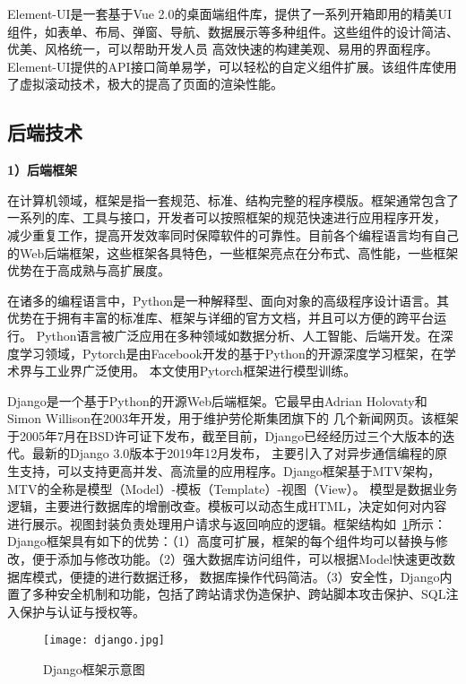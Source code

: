 Element-UI是一套基于Vue 2.0的桌面端组件库，提供了一系列开箱即用的精美UI组件，如表单、布局、弹窗、导航、数据展示等多种组件。这些组件的设计简洁、优美、风格统一，可以帮助开发人员 
高效快速的构建美观、易用的界面程序。Element-UI提供的API接口简单易学，可以轻松的自定义组件扩展。该组件库使用了虚拟滚动技术，极大的提高了页面的渲染性能。

\subsection{后端技术}

\textbf{1）后端框架}

在计算机领域，框架是指一套规范、标准、结构完整的程序模版。框架通常包含了一系列的库、工具与接口，开发者可以按照框架的规范快速进行应用程序开发，
减少重复工作，提高开发效率同时保障软件的可靠性。目前各个编程语言均有自己的Web后端框架，这些框架各具特色，一些框架亮点在分布式、高性能，一些框架优势在于高成熟与高扩展度。

在诸多的编程语言中，Python是一种解释型、面向对象的高级程序设计语言。其优势在于拥有丰富的标准库、框架与详细的官方文档，并且可以方便的跨平台运行。
Python语言被广泛应用在多种领域如数据分析、人工智能、后端开发。在深度学习领域，Pytorch是由Facebook开发的基于Python的开源深度学习框架，在学术界与工业界广泛使用。
本文使用Pytorch框架进行模型训练。

Django\cite{rubio2017beginning}是一个基于Python的开源Web后端框架。它最早由Adrian Holovaty和Simon Willison在2003年开发，用于维护劳伦斯集团旗下的
几个新闻网页。该框架于2005年7月在BSD许可证下发布，截至目前，Django已经经历过三个大版本的迭代。最新的Django 3.0版本于2019年12月发布，
主要引入了对异步通信编程的原生支持，可以支持更高并发、高流量的应用程序。Django框架基于MTV架构，MTV的全称是模型（Model）-模板（Template）-视图（View）。
模型是数据业务逻辑，主要进行数据库的增删改查。模板可以动态生成HTML，决定如何对内容进行展示。视图封装负责处理用户请求与返回响应的逻辑。框架结构如~\ref{fig:django}所示：
Django框架具有如下的优势：（1）高度可扩展，框架的每个组件均可以替换与修改，便于添加与修改功能。（2）强大数据库访问组件，可以根据Model快速更改数据库模式，便捷的进行数据迁移，
数据库操作代码简洁。（3）安全性，Django内置了多种安全机制和功能，包括了跨站请求伪造保护、跨站脚本攻击保护、SQL注入保护与认证与授权等。

\begin{figure}[htbp]
  \centering
  \texttt{[image: django.jpg]}
  \caption{Django框架示意图}
  \label{fig:django}
\end{figure}



